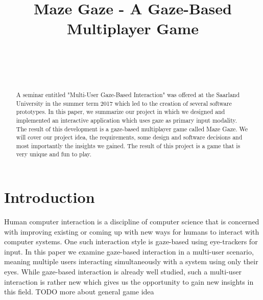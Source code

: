 \documentclass{sigchi}
\def\plaintitle{Maze Gaze - A Gaze-Based Multiplayer Game}
\def\plainkeywords{eye-tracking; gaze-based interaction; multi-user interaction; human computer interaction;}
\begin{document}
\title{\plaintitle}

\author{%
  \\
  \\
  \\
}

\maketitle

\begin{abstract}
A seminar entitled "Multi-User Gaze-Based Interaction" was offered at the Saarland University in the summer term 2017 which led to the creation of several software prototypes.  In this paper, we summarize our project in which we designed and implemented an interactive application which uses gaze as primary input modality. The result of this development is a gaze-based multiplayer game called Maze Gaze. We will cover our project idea, the requirements, some design and software decisions and most importantly the insights we gained. The result of this project is a game that is very unique and fun to play.
\end{abstract}


\section{Introduction}
Human computer interaction is a discipline of computer science that is concerned with improving existing or coming up with new ways for humans to interact with computer systems. One such interaction style is gaze-based using eye-trackers for input. In this paper we examine gaze-based interaction in a multi-user scenario, meaning multiple users interacting simultaneously with a system using only their eyes. While gaze-based interaction is already well studied, such a multi-user interaction is rather new which gives us the opportunity to gain new insights in this field. TODO more about general game idea
\end{document}
